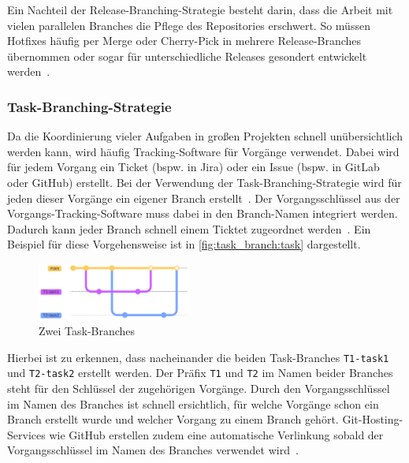 Ein Nachteil der Release\hyp Branching\hyp Strategie besteht darin, dass die Arbeit mit vielen parallelen Branches die Pflege des Repositories erschwert. So müssen Hotfixes häufig per Merge oder Cherry\hyp Pick in mehrere Release\hyp Branches übernommen oder sogar für unterschiedliche Releases gesondert entwickelt werden~\cite{hart_besten_2020}.


\subsubsection{Task\hyp Branching\hyp Strategie}

Da die Koordinierung vieler Aufgaben in großen Projekten schnell unübersichtlich werden kann, wird häufig Tracking\hyp Software für Vorgänge verwendet. Dabei wird für jedem Vorgang ein Ticket (bspw. in Jira) oder ein Issue (bspw. in GitLab oder GitHub) erstellt. Bei der Verwendung der Task\hyp Branching\hyp Strategie wird für jeden dieser Vorgänge ein eigener Branch erstellt~\cite{atlassian_hintergrundwissen_2023}. Der Vorgangsschlüssel aus der Vorgangs\hyp Tracking\hyp Software muss dabei in den Branch\hyp Namen integriert werden. Dadurch kann jeder Branch schnell einem Ticktet zugeordnet werden~\cite{atlassian_hintergrundwissen_2023}. Ein Beispiel für diese Vorgehensweise ist in \autoref{fig:task_branch:task} dargestellt. 

\begin{figure}
    \includegraphics[width=0.45\textwidth]{src/assets/diagrams/task_branch/task-branch.pdf}
    \caption{Zwei Task\hyp Branches}
    \label{fig:task_branch:task}
\end{figure}

Hierbei ist zu erkennen, dass nacheinander die beiden Task\hyp Branches \texttt{T1-task1} und \texttt{T2-task2} erstellt werden. Der Präfix \texttt{T1} und \texttt{T2} im Namen beider Branches steht für den Schlüssel der zugehörigen Vorgänge.
Durch den Vorgangsschlüssel im Namen des Branches ist schnell ersichtlich, für welche Vorgänge schon ein Branch erstellt wurde und welcher Vorgang zu einem Branch gehört. Git\hyp Hosting\hyp Services wie GitHub erstellen zudem eine automatische Verlinkung sobald der Vorgangsschlüssel im Namen des Branches verwendet wird~\cite{github_inc_autolinked_2023}.


